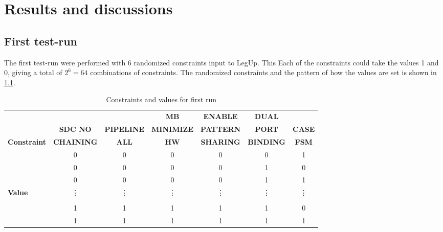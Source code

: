\chapter{Results and discussions}


\section{First test-run}
The first test-run were performed with 6 randomized constraints input to LegUp. This Each of the constraints could take the values 1 and 0, giving a total of $2^6=64$ combinations of constraints. The randomized constraints and the pattern of how the values are set is shown in \cref{tab:randomconstraint}.

\begin{table}
\tiny
    \begin{center}
    \begin{tabular}{l|cccccc}
     & & & \textbf{MB} & \textbf{ENABLE} & \textbf{DUAL} & \\
          &
          \textbf{SDC NO} & 
          \textbf{PIPELINE} & 
          \textbf{MINIMIZE} & 
          \textbf{PATTERN} & 
          \textbf{PORT} &
          \textbf{CASE} \\
        \textbf{Constraint}
           & \textbf{CHAINING}
           & \textbf{ALL}
           & \textbf{HW}
           & \textbf{SHARING}
           & \textbf{BINDING}
           & \textbf{FSM}
    \\ \midrule
    & 0 & 0 & 0 & 0 & 0 & 1 \\
    & 0 & 0 & 0 & 0 & 1 & 0 \\
    & 0 & 0 & 0 & 0 & 1 & 1 \\
    \textbf{Value} & \vdots & \vdots & \vdots & \vdots & \vdots & \vdots \\
    & &  &  &  &  &  \\
    & 1 & 1 & 1 & 1 & 1 & 0 \\
    & 1 & 1 & 1 & 1 & 1 & 1
    \\ \bottomrule
    \end{tabular}
    \caption{\label{tab:randomconstraint}Constraints and values for first run}
    \end{center}
\end{table}



